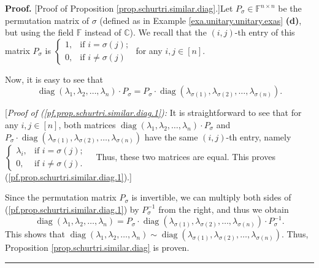 \documentclass[numbers=enddot,12pt,final,onecolumn,notitlepage]{scrartcl}%
\numberwithin{exer}{subsection}
\theoremstyle{definition}
\newenvironment{proof}[1][Proof]{\noindent\textbf{#1.} }{\ \rule{0.5em}{0.5em}}
\begin{document}
\begin{proof}
[Proof of Proposition \ref{prop.schurtri.similar.diag}.]Let $P_{\sigma}%
\in\mathbb{F}^{n\times n}$ be the permutation matrix of $\sigma$ (defined as
in Example \ref{exa.unitary.unitary.exas} \textbf{(d)}, but using the field
$\mathbb{F}$ instead of $\mathbb{C}$). We recall that the $\left(  i,j\right)
$-th entry of this matrix $P_{\sigma}$ is $%
\begin{cases}
1, & \text{if }i=\sigma\left(  j\right)  ;\\
0, & \text{if }i\neq\sigma\left(  j\right)
\end{cases}
$ for any $i,j\in\left[  n\right]  $.

Now, it is easy to see that%
\begin{equation}
\operatorname*{diag}\left(  \lambda_{1},\lambda_{2},\ldots,\lambda_{n}\right)
\cdot P_{\sigma}=P_{\sigma}\cdot\operatorname*{diag}\left(  \lambda
_{\sigma\left(  1\right)  },\lambda_{\sigma\left(  2\right)  },\ldots
,\lambda_{\sigma\left(  n\right)  }\right)  .
\label{pf.prop.schurtri.similar.diag.1}%
\end{equation}


[\textit{Proof of (\ref{pf.prop.schurtri.similar.diag.1}):} It is
straightforward to see that for any $i,j\in\left[  n\right]  $, both matrices
$\operatorname*{diag}\left(  \lambda_{1},\lambda_{2},\ldots,\lambda
_{n}\right)  \cdot P_{\sigma}$ and $P_{\sigma}\cdot\operatorname*{diag}\left(
\lambda_{\sigma\left(  1\right)  },\lambda_{\sigma\left(  2\right)  }%
,\ldots,\lambda_{\sigma\left(  n\right)  }\right)  $ have the same $\left(
i,j\right)  $-th entry, namely $%
\begin{cases}
\lambda_{i}, & \text{if }i=\sigma\left(  j\right)  ;\\
0, & \text{if }i\neq\sigma\left(  j\right)  .
\end{cases}
$\ \ Thus, these two matrices are equal. This proves
(\ref{pf.prop.schurtri.similar.diag.1}).] \medskip

Since the permutation matrix $P_{\sigma}$ is invertible, we can multiply both
sides of (\ref{pf.prop.schurtri.similar.diag.1}) by $P_{\sigma}^{-1}$ from the
right, and thus we obtain
\[
\operatorname*{diag}\left(  \lambda_{1},\lambda_{2},\ldots,\lambda_{n}\right)
=P_{\sigma}\cdot\operatorname*{diag}\left(  \lambda_{\sigma\left(  1\right)
},\lambda_{\sigma\left(  2\right)  },\ldots,\lambda_{\sigma\left(  n\right)
}\right)  \cdot P_{\sigma}^{-1}.
\]
This shows that $\operatorname*{diag}\left(  \lambda_{1},\lambda_{2}%
,\ldots,\lambda_{n}\right)  \sim\operatorname*{diag}\left(  \lambda
_{\sigma\left(  1\right)  },\lambda_{\sigma\left(  2\right)  },\ldots
,\lambda_{\sigma\left(  n\right)  }\right)  $. Thus, Proposition
\ref{prop.schurtri.similar.diag} is proven.
\end{proof}
\end{document}
